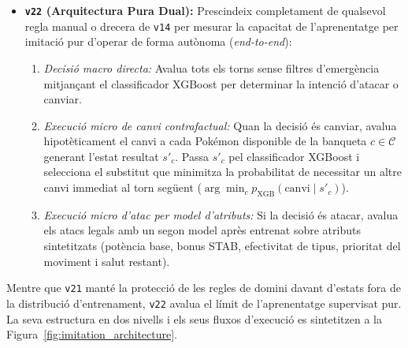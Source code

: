 \begin{itemize}
    \item \textbf{\texttt{v22} (Arquitectura Pura Dual):} Prescindeix completament de qualsevol regla manual o drecera de \texttt{v14} per mesurar la capacitat de l'aprenentatge per imitació pur d'operar de forma autònoma (\emph{end-to-end}):
    \begin{enumerate}
        \item \emph{Decisió macro directa:} Avalua tots els torns sense filtres d'emergència mitjançant el classificador XGBoost per determinar la intenció d'atacar o canviar.
        \item \emph{Execució micro de canvi contrafactual:} Quan la decisió és canviar, avalua hipotèticament el canvi a cada Pokémon disponible de la banqueta $c \in \mathcal{C}$ generant l'estat resultat $s'_c$. Passa $s'_c$ pel classificador XGBoost i selecciona el substitut que minimitza la probabilitat de necessitar un altre canvi immediat al torn següent ($\arg\min_c p_{\text{XGB}}(\text{canvi} \mid s'_c)$).
        \item \emph{Execució micro d'atac per model d'atributs:} Si la decisió és atacar, avalua els atacs legals amb un segon model après entrenat sobre atributs sintetitzats (potència base, bonus STAB, efectivitat de tipus, prioritat del moviment i salut restant).
    \end{enumerate}
\end{itemize}

Mentre que \texttt{v21} manté la protecció de les regles de domini davant d'estats fora de la distribució d'entrenament, \texttt{v22} avalua el límit de l'aprenentatge supervisat pur. La seva estructura en dos nivells i els seus fluxos d'execució es sintetitzen a la Figura~\ref{fig:imitation_architecture}.

